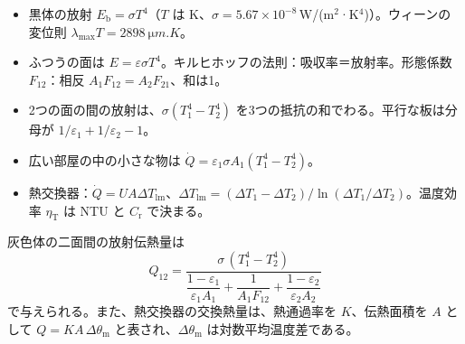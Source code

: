 \begin{taisetsu}
\begin{itemize}[leftmargin=1.2\zw, itemsep=2pt, topsep=0pt, label={\color{bkNavy}●}]\raggedright
\item 黒体の放射 $E_{\mathrm b}=\sigma T^4$（$T$ は K、$\sigma=5.67\times10^{-8}$\,W/(m$^2$·K$^4$)）。ウィーンの変位則 $\lambda_{\max}T=\qty{2898}{\micro m.K}$。
\item ふつうの面は $E=\varepsilon\sigma T^4$。キルヒホッフの法則：吸収率＝放射率。形態係数 $F_{12}$：相反 $A_1F_{12}=A_2F_{21}$、和は1。
\item 2つの面の間の放射は、$\sigma(T_1^4-T_2^4)$ を3つの抵抗の和でわる。平行な板は分母が $1/\varepsilon_1+1/\varepsilon_2-1$。
\item 広い部屋の中の小さな物は $\dot Q=\varepsilon_1\sigma A_1(T_1^4-T_2^4)$。
\item 熱交換器：$\dot Q=UA\Delta T_{\mathrm{lm}}$、$\Delta T_{\mathrm{lm}}=(\Delta T_1-\Delta T_2)/\ln(\Delta T_1/\Delta T_2)$。温度効率 $\eta_{\mathrm T}$ は NTU と $C_{\mathrm r}$ で決まる。
\end{itemize}
\end{taisetsu}

\begin{kotoba}\small
{}
\end{kotoba}

\begin{senmonsho}
\begin{bkhonbun}
灰色体の二面間の放射伝熱量は
\[ Q_{12}=\frac{\sigma\,(T_1^4-T_2^4)}{\dfrac{1-\varepsilon_1}{\varepsilon_1A_1}+\dfrac{1}{A_1F_{12}}+\dfrac{1-\varepsilon_2}{\varepsilon_2A_2}} \]
で与えられる。また、熱交換器の交換熱量は、熱通過率を $K$、伝熱面積を $A$ として $Q=KA\,\Delta\theta_{\mathrm m}$ と表され、$\Delta\theta_{\mathrm m}$ は対数平均温度差である。
\end{bkhonbun}
\end{senmonsho}

